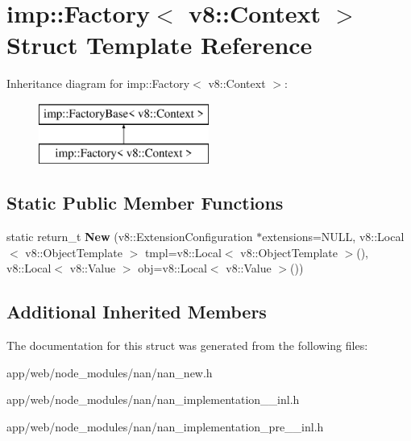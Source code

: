 \hypertarget{structimp_1_1_factory_3_01v8_1_1_context_01_4}{}\section{imp\+:\+:Factory$<$ v8\+:\+:Context $>$ Struct Template Reference}
\label{structimp_1_1_factory_3_01v8_1_1_context_01_4}
Inheritance diagram for imp\+:\+:Factory$<$ v8\+:\+:Context $>$\+:\begin{figure}[H]
\begin{center}
\leavevmode
\includegraphics[height=2.000000cm]{structimp_1_1_factory_3_01v8_1_1_context_01_4}
\end{center}
\end{figure}
\subsection*{Static Public Member Functions}
\begin{DoxyCompactItemize}
\item 
\mbox{\label{structimp_1_1_factory_3_01v8_1_1_context_01_4_ae1cd3ce26270279d68b8ca321ff89f75}} 
static return\+\_\+t {\bfseries New} (v8\+::\+Extension\+Configuration $\ast$extensions=N\+U\+LL, v8\+::\+Local$<$ v8\+::\+Object\+Template $>$ tmpl=v8\+::\+Local$<$ v8\+::\+Object\+Template $>$(), v8\+::\+Local$<$ v8\+::\+Value $>$ obj=v8\+::\+Local$<$ v8\+::\+Value $>$())
\end{DoxyCompactItemize}
\subsection*{Additional Inherited Members}


The documentation for this struct was generated from the following files\+:\begin{DoxyCompactItemize}
\item 
app/web/node\+\_\+modules/nan/nan\+\_\+new.\+h\item 
app/web/node\+\_\+modules/nan/nan\+\_\+implementation\+\_\+\_\+inl.\+h\item 
app/web/node\+\_\+modules/nan/nan\+\_\+implementation\+\_\+pre\+\_\+\_\+inl.\+h\end{DoxyCompactItemize}
